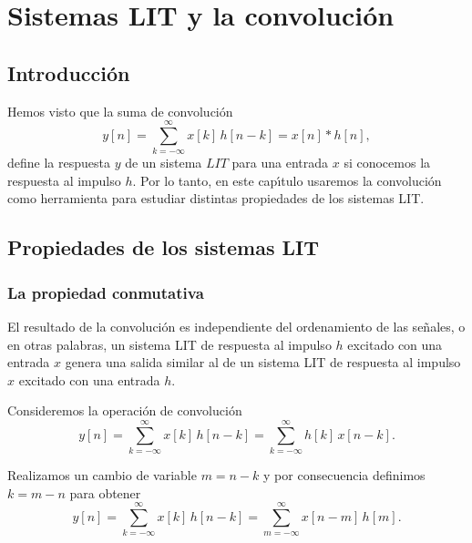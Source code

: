 \chapter{Sistemas LIT y la convolución}

\section{Introducci\'{o}n}

Hemos visto que la suma de convoluci\'{o}n 
\begin{equation}
    y\left[ n\right] =
     \sum_{k=-\infty }^{\infty }x\left[ k\right] \, h\left[ n-k\right] = x\left[ n\right] * h\left[ n\right] ,
\end{equation}
define la respuesta $y$ de un sistema $LIT$ para una entrada $x$ si conocemos la respuesta al 
impulso $h$. Por lo tanto, en este cap\'{\i}tulo usaremos la convoluci\'{o}n como herramienta para 
estudiar distintas propiedades de los sistemas LIT.

\section{Propiedades de los sistemas LIT}

\subsection{La propiedad conmutativa}

El resultado de la convoluci\'{o}n es independiente del ordenamiento de las se\~{n}ales, o en otras 
palabras, un sistema LIT de respuesta al impulso $h$ excitado con una entrada $x$ genera una salida 
similar al de un sistema LIT de respuesta al impulso $x$ excitado con una entrada $h$.

Consideremos la operaci\'{o}n de convoluci\'{o}n
\begin{equation}
y\left[ n\right] =
        \sum_{k=-\infty }^{\infty }x\left[ k\right] \, h\left[ n-k\right] =
        \sum_{k=-\infty }^{\infty }h\left[ k\right] \, x\left[ n-k\right].
\end{equation}

Realizamos un cambio de variable $m=n-k$ y por consecuencia definimos $k=m-n$ para obtener
\begin{equation}
        y\left[ n\right] =
                \sum_{k=-\infty }^{\infty }x\left[ k\right] \, h\left[ n-k\right] =
                \sum_{m=-\infty }^{\infty }x\left[ n-m\right] \, h\left[ m\right].
\end{equation}

